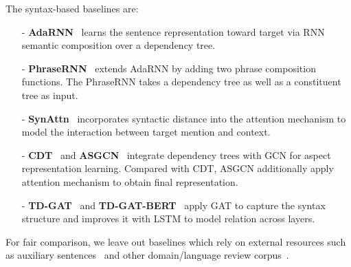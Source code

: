 \documentclass[journal]{IEEEtran}
\begin{document}
	\begin{table}
\end{table}
	
	The syntax-based baselines are: 
	\begin{itemize}
		\item[-] \textbf{AdaRNN}~\cite{dong-etal-2014-adaptive} learns the sentence representation toward target via RNN semantic composition over a dependency tree. 
		
		\item[-] \textbf{PhraseRNN}~\cite{Nguyen2015PhraseRNNPR} extends AdaRNN by adding two phrase composition functions. The PhraseRNN takes a dependency tree as well as a constituent tree as input.
		
		\item[-] \textbf{SynAttn}~\cite{he-etal-2018-effective} incorporates syntactic distance into the attention mechanism to model the interaction between target mention and context.
		
		\item[-] \textbf{CDT}~\cite{sun-etal-2019-aspect} and \textbf{ASGCN}~\cite{zhang-etal-2019-aspect} integrate dependency trees with GCN for aspect representation learning. Compared with CDT, ASGCN additionally apply attention mechanism to obtain final representation.
		
		\item[-] \textbf{TD-GAT}~\cite{huang-carley-2019-syntax} and \textbf{TD-GAT-BERT}~\cite{huang-carley-2019-syntax} apply GAT to capture the syntax structure and improves it with LSTM to model relation across layers.
	\end{itemize}
	
	For fair comparison, we leave out baselines which rely on external resources such as auxiliary sentences~\cite{sun-etal-2019-utilizing} and other domain/language review corpus~\cite{xu-etal-2019-bert,Gao19bertABSA,Yang2019AML}.
	
\end{document}
